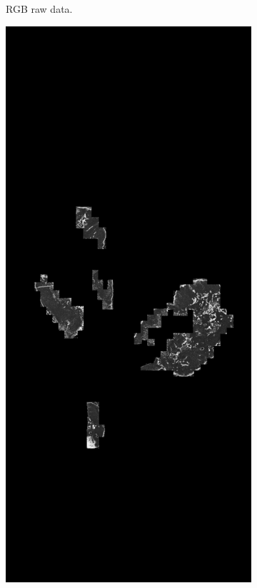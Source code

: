 \documentclass[a4paper,10pt]{article}
\begin{document}
\begin{figure}[!ht]
\begin{subfigure}{.33\textwidth}
  \caption{RGB raw data.}
  \label{fig:sub1}
\end{subfigure}%
\begin{subfigure}{.33\textwidth}
  \centering
  \includegraphics[width=\linewidth]{whole_probmap_Test_002.png}

\end{subfigure}
\end{figure}
\end{document}
